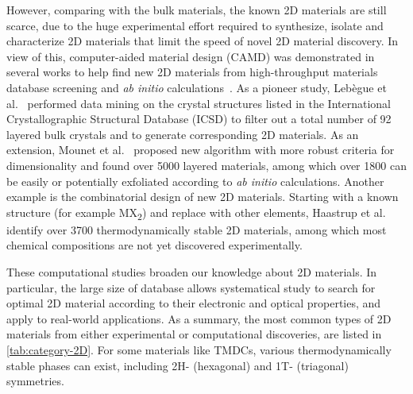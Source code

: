 %
However, comparing with the bulk materials, the known 2D materials are
still scarce, due to the
huge experimental effort required to synthesize, isolate and
characterize 2D materials that limit the speed of novel 2D material
discovery.
% 
In view of this, computer-aided material design (CAMD) was
demonstrated in several works to help find new 2D materials from
high-throughput materials database screening and \textit{ab initio}
calculations~\cite{Lebegue_2013_prx,Zhuang_2013_database,Haastrup_2018_database,Mounet_2018_database,Zhou_2019_database}.
%
As a pioneer study, Lebègue et al.~\cite{Lebegue_2013_prx} performed
data mining on the crystal structures listed in the International
Crystallographic Structural Database (ICSD) to filter out a total
number of 92 layered bulk crystals and to generate corresponding 2D
materials. As an extension, Mounet et al.~\cite{Mounet_2018_database}
proposed new algorithm with more robust criteria for dimensionality
and found over 5000 layered materials, among which over 1800 can be
easily or potentially exfoliated according to \textit{ab initio}
calculations.
%
Another example is the combinatorial design of new 2D materials.
Starting with a known structure (for example MX\textsubscript{2}) and
replace with other elements, Haastrup et
al.~\cite{Haastrup_2018_database} identify over 3700
thermo\-dynamically stable 2D materials, among which most chemical
compositions are not yet discovered experimentally.

These computational studies broaden our knowledge about 2D
materials. In particular, the large size of database allows
systematical study to search for optimal 2D material according to
their electronic and optical properties, and apply to real-world
applications. As a summary, the most common types of 2D materials from
either experimental or computational discoveries, are listed in
\autoref{tab:category-2D}. For some materials like TMDCs, various
thermo\-dynamically stable phases can exist, including 2H- (hexagonal)
and 1T- (triagonal) symmetries.

